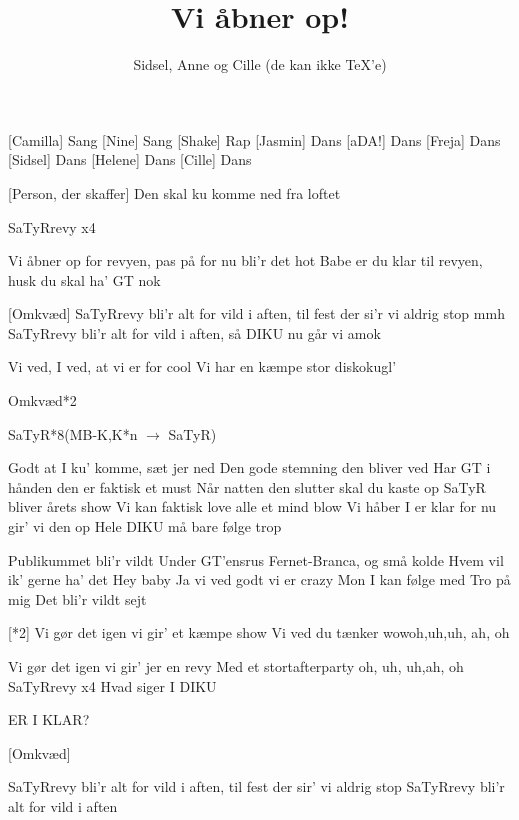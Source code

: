 \documentclass[a4paper,11pt]{article}
\title{Vi åbner op!}
\author{Sidsel, Anne og Cille (de kan ikke \TeX'e)}
\begin{document}
\maketitle

\begin{roles}
    [Camilla] Sang
    [Nine] Sang
    [Shake] Rap
    [Jasmin] Dans
    [aDA!] Dans
    [Freja] Dans
    [Sidsel] Dans
    [Helene] Dans
    [Cille] Dans
\end{roles}

\begin{props}
    [Person, der skaffer] Den skal ku komme ned fra loftet
\end{props}

\begin{song}
   SaTyRrevy x4

  Vi åbner op for revyen, pas på for nu bli’r det hot
  Babe er du klar til revyen, husk du skal ha’ GT nok

 [Omkvæd] SaTyRrevy bli’r alt for vild i aften, til fest der si’r vi aldrig stop mmh
 SaTyRrevy bli’r alt for vild i aften, så DIKU nu går vi amok



 Vi ved, I ved, at vi er for cool
 Vi har en kæmpe stor diskokugl’

 Omkvæd*2

 SaTyR*8(MB-K,K*n $\rightarrow$ SaTyR)


 Godt at I ku’ komme, sæt jer ned
 Den gode stemning den bliver ved
 Har GT i hånden den er faktisk et must
 Når natten den slutter skal du kaste op
 SaTyR bliver årets show
 Vi kan faktisk love alle et mind blow
 Vi håber I er klar for nu gir’ vi den op
 Hele DIKU må bare følge trop

 Publikummet bli’r vildt
 Under GT’ensrus
 Fernet-Branca, og små kolde
 Hvem vil ik’ gerne ha’ det
 Hey baby
 Ja vi ved godt vi er crazy
 Mon I kan følge med
 Tro på mig
 Det bli’r vildt sejt

 [*2]
 Vi gør det igen vi gir’ et kæmpe show
 Vi ved du tænker wowoh,uh,uh, ah, oh

 Vi gør det igen vi gir’ jer en revy
 Med et stortafterparty oh, uh, uh,ah, oh
 SaTyRrevy x4
 Hvad siger I DIKU

 ER I KLAR?

 [Omkvæd]

  SaTyRrevy bli’r alt for vild i aften, til fest der sir’ vi aldrig stop
 SaTyRrevy bli’r alt for vild i aften

\end{song}
\end{document}
